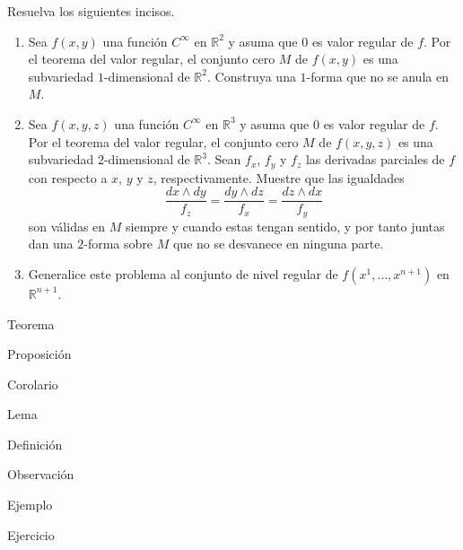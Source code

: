 \documentclass[12pt]{report}
\theoremstyle{largebreak}
\begin{document}
    \begin{excer}
        Resuelva los siguientes incisos.
        \begin{enumerate}
            \item Sea $f(x,y)$ una función $C^\infty$ en $\mathbb{R}^2$ y asuma que $0$ es valor regular de $f$. Por el teorema del valor regular, el conjunto cero $M$ de $f(x,y)$ es una subvariedad $1$-dimensional de $\mathbb{R}^2$. Construya una $1$-forma que no se anula en $M$.
            \item Sea $f(x,y,z)$ una función $C^\infty$ en $\mathbb{R}^3$ y asuma que $0$ es valor regular de $f$. Por el teorema del valor regular, el conjunto cero $M$ de $f(x,y,z)$ es una subvariedad $2$-dimensional de $\mathbb{R}^3$. Sean $f_x$, $f_y$ y $f_z$ las derivadas parciales de $f$ con respecto a $x$, $y$ y $z$, respectivamente. Muestre que las igualdades
            \begin{equation*}
                \frac{dx\wedge dy}{f_z}=\frac{dy\wedge dz}{f_x}=\frac{dz\wedge dx}{f_y}
            \end{equation*}
            son válidas en $M$ siempre y cuando estas tengan sentido, y por tanto juntas dan una $2$-forma sobre $M$ que no se desvanece en ninguna parte.
            \item Generalice este problema al conjunto de nivel regular de $f(x^1,\dots,x^{n+1})$ en $\mathbb{R}^{n+1}$.
        \end{enumerate}
    \end{excer}

    \newpage

    \begin{theor}[Nombre]
        Teorema
    \end{theor}

    \begin{propo}[Nombre]
        Proposición
    \end{propo}

    \begin{cor}[Nombre]
        Corolario
    \end{cor}

    \begin{lema}[Nombre]
        Lema
    \end{lema}

    \begin{mydef}[Nombre]
        Definición
    \end{mydef}

    \begin{obs}[Nombre]
        Observación
    \end{obs}

    \begin{exa}[Nombre]
        Ejemplo
    \end{exa}

    \begin{excer}[Nombre]
        Ejercicio
    \end{excer}
\end{document}
